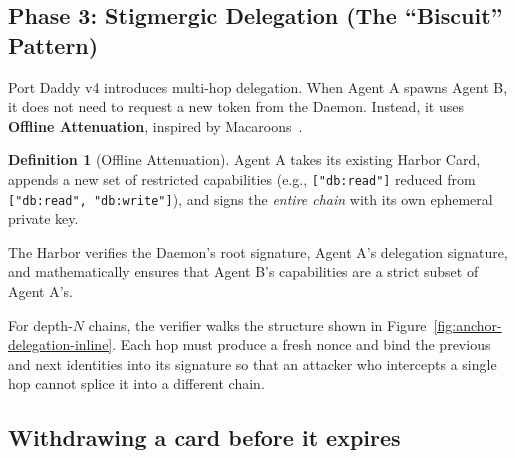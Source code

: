 \documentclass[11pt,a4paper]{article}
\theoremstyle{definition}
\newtheorem{definition}{Definition}[section]
\begin{document}
\subsection{Phase 3: Stigmergic Delegation (The ``Biscuit'' Pattern)}

Port Daddy v4 introduces multi-hop delegation. When Agent A spawns Agent B, it does not need to request a new token from the Daemon. Instead, it uses \textbf{Offline Attenuation}, inspired by Macaroons~\cite{birgisson2014macaroons}.

\begin{definition}[Offline Attenuation]\label{def:offline-attn}
Agent A takes its existing Harbor Card, appends a new set of restricted capabilities (e.g., \texttt{["db:read"]} reduced from \texttt{["db:read", "db:write"]}), and signs the \textit{entire chain} with its own ephemeral private key.

The Harbor verifies the Daemon's root signature, Agent A's delegation signature, and mathematically ensures that Agent B's capabilities are a strict subset of Agent A's.
\end{definition}

For depth-$N$ chains, the verifier walks the structure shown in Figure~\ref{fig:anchor-delegation-inline}. Each hop must produce a fresh nonce and bind the previous and next identities into its signature so that an attacker who intercepts a single hop cannot splice it into a different chain.



\subsection{Withdrawing a card before it expires}\label{sec:revocation}
\end{document}
